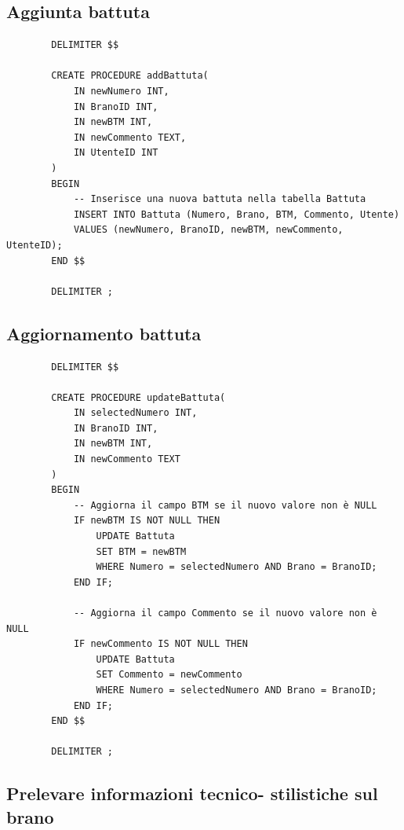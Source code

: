 \documentclass{article}
\begin{document}
    \subsection{Aggiunta battuta}

    \begin{verbatim}
        DELIMITER $$

        CREATE PROCEDURE addBattuta(
            IN newNumero INT,
            IN BranoID INT,
            IN newBTM INT,
            IN newCommento TEXT,
            IN UtenteID INT
        )
        BEGIN
            -- Inserisce una nuova battuta nella tabella Battuta
            INSERT INTO Battuta (Numero, Brano, BTM, Commento, Utente)
            VALUES (newNumero, BranoID, newBTM, newCommento, UtenteID);
        END $$

        DELIMITER ;
    \end{verbatim}
    
    \subsection{Aggiornamento battuta}
    
    \begin{verbatim}
        DELIMITER $$

        CREATE PROCEDURE updateBattuta(
            IN selectedNumero INT,
            IN BranoID INT,
            IN newBTM INT,
            IN newCommento TEXT
        )
        BEGIN
            -- Aggiorna il campo BTM se il nuovo valore non è NULL
            IF newBTM IS NOT NULL THEN
                UPDATE Battuta
                SET BTM = newBTM
                WHERE Numero = selectedNumero AND Brano = BranoID;
            END IF;

            -- Aggiorna il campo Commento se il nuovo valore non è NULL
            IF newCommento IS NOT NULL THEN
                UPDATE Battuta
                SET Commento = newCommento
                WHERE Numero = selectedNumero AND Brano = BranoID;
            END IF;
        END $$

        DELIMITER ;
    \end{verbatim}
    
    \subsection{Prelevare informazioni tecnico-
    stilistiche sul brano}
    
\end{document}
